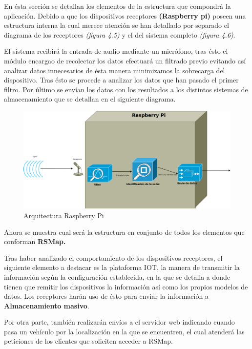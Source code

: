 En ésta sección se detallan los elementos de la estructura que compondrá la aplicación. Debido a que los dispositivos receptores \textbf{(Raspberry pi)} poseen una estructura interna la cual merece atención se han detallado por separado el diagrama de los receptores \textit{(figura 4.5)} y el del sistema completo \textit{(figura 4.6)}.

\bigskip

El sistema recibirá la entrada de audio mediante un micrófono, tras ésto el módulo encargao de recolectar los datos efectuará un filtrado previo evitando así analizar datos innecesarios de ésta manera minimizamos la sobrecarga del dispositivo. Tras ésto se procede a analizar los datos que han pasado el primer filtro. Por último se envían los datos con los resultados a los distintos sistemas de almacenamiento que se detallan en el siguiente diagrama.

\bigskip

\begin{figure}[!ht]
  \begin{center}
  \includegraphics[scale=0.25]{../images/diag_plan/diag_arqu_pi.png}
  \caption{Arquitectura Raspberry Pi}
  \label{fig:ar_rpi}
  \end{center}
\end{figure}

Ahora se muestra cual será la estructura en conjunto de todos los elementos que conforman \textbf{RSMap.}


Tras haber analizado el comportamiento de los dispositivos receptores, el siguiente elemento a destacar es la plataforma IOT, la manera de transmitir la información según la configuración establecida, en la que se detalla a donde tienen que remitir los dispositivos la información así como los propios modelos de datos. Los receptores harán uso de ésto para enviar la información a \textbf{Almacenamiento masivo}.

Por otra parte, también realizarán envíos a el servidor web indicando cuando pasa un vehículo por la localización en la que se encuentren, el cual atenderá las peticiones de los clientes que soliciten acceder a RSMap.


